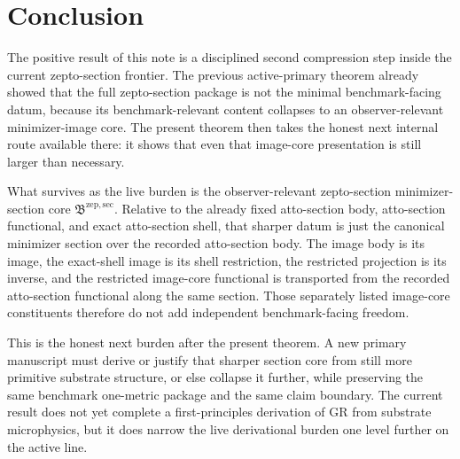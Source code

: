 \documentclass[11pt]{article}
\newcommand{\ZeptoMinSectionCore}{\mathfrak B^{\mathrm{zep,sec}}}
\begin{document}
\section{Conclusion}

The positive result of this note is a disciplined second compression step inside the current zepto-section frontier. The previous active-primary theorem already showed that the full zepto-section package is not the minimal benchmark-facing datum, because its benchmark-relevant content collapses to an observer-relevant minimizer-image core. The present theorem then takes the honest next internal route available there: it shows that even that image-core presentation is still larger than necessary.

What survives as the live burden is the observer-relevant zepto-section minimizer-section core \(\ZeptoMinSectionCore\). Relative to the already fixed atto-section body, atto-section functional, and exact atto-section shell, that sharper datum is just the canonical minimizer section over the recorded atto-section body. The image body is its image, the exact-shell image is its shell restriction, the restricted projection is its inverse, and the restricted image-core functional is transported from the recorded atto-section functional along the same section. Those separately listed image-core constituents therefore do not add independent benchmark-facing freedom.

This is the honest next burden after the present theorem. A new primary manuscript must derive or justify that sharper section core from still more primitive substrate structure, or else collapse it further, while preserving the same benchmark one-metric package and the same claim boundary. The current result does not yet complete a first-principles derivation of GR from substrate microphysics, but it does narrow the live derivational burden one level further on the active line.
\end{document}
